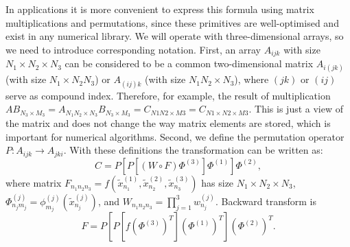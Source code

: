 In applications it is more convenient to express this formula using matrix multiplications and permutations,
since these primitives are well-optimised and exist in any numerical library.
We will operate with three-dimensional arrays,
so we need to introduce corresponding notation.
First, an array $A_{ijk}$ with size $N_1 \times N_2 \times N_3$ can be considered to be a common two-dimensional matrix $A_{i(jk)}$ (with size $N_1 \times N_2 N_3$) or $A_{(ij)k}$ (with size $N_1 N_2 \times N_3$),
where $(jk)$ or $(ij)$ serve as compound index.
Therefore, for example, the result of multiplication $AB_{N_3 \times M_3} = A_{N_1 N_2 \times N_3} B_{N_3 \times M_3} = C_{N1 N2 \times M3} = C_{N1 \times N2 \times M3}$.
This is just a view of the matrix and does not change the way matrix elements are stored,
which is important for numerical algorithms.
Second, we define the permutation operator $P: A_{ijk} \rightarrow A_{jki}$.
With these definitions the transformation can be written as:
\[
    C = P[P[(W \circ F) \Phi^{(3)}] \Phi^{(1)}] \Phi^{(2)},
\]
where matrix $F_{n_1 n_2 n_3} = f(\tilde{x}_{n_1}^{(1)}, \tilde{x}_{n_2}^{(2)}, \tilde{x}_{n_3}^{(3)})$ has size $N_1 \times N_2 \times N_3$,
$\Phi^{(j)}_{n_j m_j} = \phi_{m_j}^{(j)} (\tilde{x}_{n_j}^{(j)})$,
and $W_{n_1 n_2 n_3} = \prod_{j=1}^3 w_{n_j}^{(j)}$.
Backward transform is
\[
    F = P[P[f (\Phi^{(3)})^T] (\Phi^{(1)})^T] (\Phi^{(2)})^T.
\]

